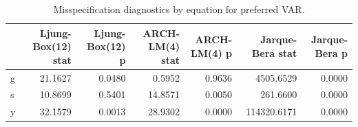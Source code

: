 \begin{table}[H]
\centering
\caption{Misspecification diagnostics by equation for preferred VAR.}
\label{tab:diagnostics}
\begin{tabular}{lrrrrrr}
\toprule
 & Ljung-Box(12) stat & Ljung-Box(12) p & ARCH-LM(4) stat & ARCH-LM(4) p & Jarque-Bera stat & Jarque-Bera p \\
\midrule
g & 21.1627 & 0.0480 & 0.5952 & 0.9636 & 4505.6529 & 0.0000 \\
s & 10.8699 & 0.5401 & 14.8571 & 0.0050 & 261.6600 & 0.0000 \\
y & 32.1579 & 0.0013 & 28.9302 & 0.0000 & 114320.6171 & 0.0000 \\
\bottomrule
\end{tabular}
\end{table}